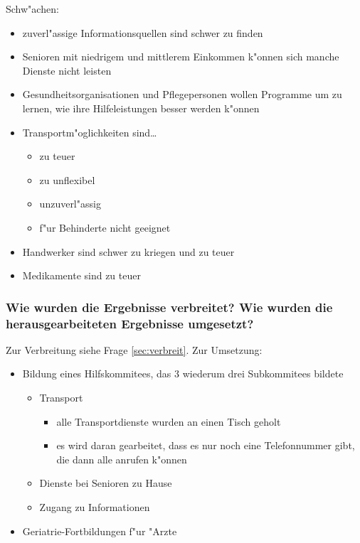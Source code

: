 \noindent Schw"achen:
\begin{itemize}
        \item zuverl"assige Informationsquellen sind schwer zu finden
        \item Senioren mit niedrigem und mittlerem Einkommen k"onnen sich manche Dienste nicht leisten
        \item Gesundheitsorganisationen und Pflegepersonen wollen Programme um zu lernen, wie ihre Hilfeleistungen besser werden k"onnen
        \item Transportm"oglichkeiten sind\ldots
                \begin{itemize}
                        \item zu teuer
                        \item zu unflexibel
                        \item unzuverl"assig
                        \item f"ur Behinderte nicht geeignet
                \end{itemize}
        \item Handwerker sind schwer zu kriegen und zu teuer
        \item Medikamente sind zu teuer
\end{itemize}

\subsubsection{Wie wurden die Ergebnisse verbreitet? Wie wurden die herausgearbeiteten Ergebnisse umgesetzt?}

Zur Verbreitung siehe Frage \ref{sec:verbreit}. Zur Umsetzung: 
\begin{itemize}
        \item Bildung eines Hilfskommitees, das 3 wiederum drei Subkommitees bildete
                \begin{itemize}
                        \item Transport
                                \begin{itemize}
                                        \item alle Transportdienste wurden an einen Tisch geholt
                                        \item es wird daran gearbeitet, dass es nur noch eine Telefonnummer gibt, die dann alle anrufen k"onnen
                                \end{itemize}
                        \item Dienste bei Senioren zu Hause
                        \item Zugang zu Informationen
                \end{itemize}
        \item Geriatrie-Fortbildungen f"ur "Arzte
\end{itemize}


